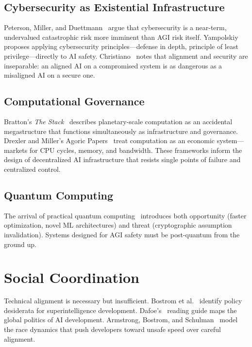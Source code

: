 \documentclass[11pt,twocolumn]{article}
\begin{document}
\subsection{Cybersecurity as Existential Infrastructure}

Peterson, Miller, and Duettmann~\cite{peterson2018cyber} argue that
cybersecurity is a near-term, undervalued catastrophic risk more imminent than
AGI risk itself. Yampolskiy~\cite{yampolskiy2017cybersecurity} proposes applying
cybersecurity principles---defense in depth, principle of least
privilege---directly to AI safety. Christiano~\cite{christiano2019alignment}
notes that alignment and security are inseparable: an aligned AI on a compromised
system is as dangerous as a misaligned AI on a secure one.

\subsection{Computational Governance}

Bratton's \textit{The Stack}~\cite{bratton2015stack} describes planetary-scale
computation as an accidental megastructure that functions simultaneously as
infrastructure and governance. Drexler and Miller's Agoric
Papers~\cite{drexler1988agoric} treat computation as an economic system---markets
for CPU cycles, memory, and bandwidth. These frameworks inform the design of
decentralized AI infrastructure that resists single points of failure and
centralized control.

\subsection{Quantum Computing}

The arrival of practical quantum computing~\cite{zeng2017quantum} introduces
both opportunity (faster optimization, novel ML architectures) and threat
(cryptographic assumption invalidation). Systems designed for AGI safety must
be post-quantum from the ground up.

\section{Social Coordination}
\label{sec:coordination}

Technical alignment is necessary but insufficient. Bostrom et
al.~\cite{bostrom2017policy} identify policy desiderata for superintelligence
development. Dafoe's~\cite{dafoe2018global} reading guide maps the global
politics of AI development. Armstrong, Bostrom, and
Schulman~\cite{armstrong2016racing} model the race dynamics that push developers
toward unsafe speed over careful alignment.
\end{document}
